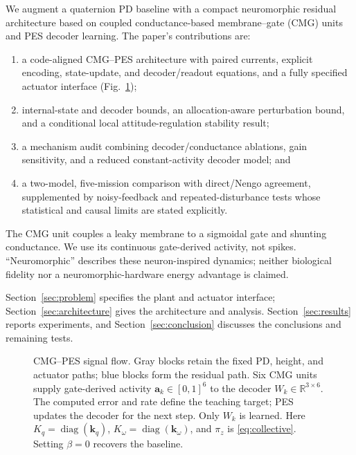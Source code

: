 \documentclass[letterpaper, 10 pt, conference]{ieeeconf}
\newcommand{\R}{\mathbb R}
\begin{document}
We augment a quaternion PD baseline with a compact neuromorphic residual architecture based on coupled conductance-based membrane--gate (CMG) units and PES decoder learning. The paper's contributions are:
\begin{enumerate}
    \item a code-aligned CMG--PES architecture with paired currents, explicit encoding, state-update, and decoder/readout equations, and a fully specified actuator interface (Fig.~\ref{fig:arch});
    \item internal-state and decoder bounds, an allocation-aware perturbation bound, and a conditional local attitude-regulation stability result;
    \item a mechanism audit combining decoder/conductance ablations, gain sensitivity, and a reduced constant-activity decoder model; and
    \item a two-model, five-mission comparison with direct/Nengo agreement, supplemented by noisy-feedback and repeated-disturbance tests whose statistical and causal limits are stated explicitly.
\end{enumerate}

The CMG unit couples a leaky membrane to a sigmoidal gate and shunting conductance. We use its continuous gate-derived activity, not spikes. ``Neuromorphic'' describes these neuron-inspired dynamics; neither biological fidelity nor a neuromorphic-hardware energy advantage is claimed.

Section~\ref{sec:problem} specifies the plant and actuator interface; Section~\ref{sec:architecture} gives the architecture and analysis. Section~\ref{sec:results} reports experiments, and Section~\ref{sec:conclusion} discusses the conclusions and remaining tests.

\begin{figure}[t]

\centering
\resizebox{\textwidth}{!}{}
\caption{CMG--PES signal flow. Gray blocks retain the fixed PD, height,
and actuator paths; blue blocks form the residual path. Six CMG units
supply gate-derived activity $\bm a_k\in[0,1]^6$ to the decoder
$W_k\in\R^{3\times6}$. The computed error and rate define the teaching
target; PES updates the decoder for the next step. Only $W_k$ is learned.
Here $K_q=\operatorname{diag}(\bm k_q)$,
$K_\omega=\operatorname{diag}(\bm k_\omega)$, and $\pi_z$ is
\eqref{eq:collective}. Setting $\beta=0$ recovers the baseline.}
\label{fig:arch}
\end{figure}
\end{document}
